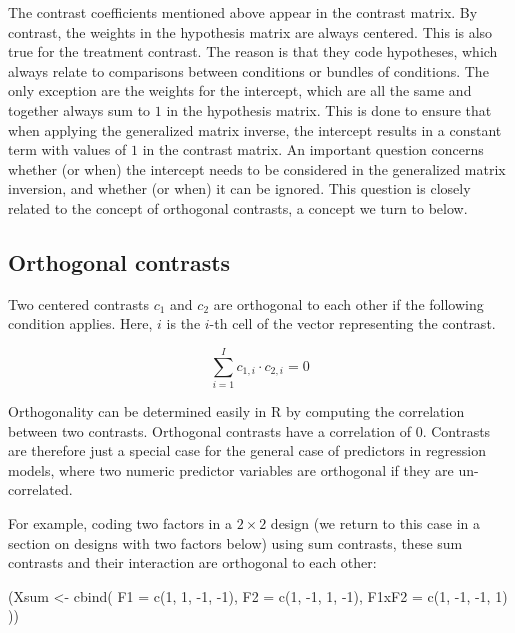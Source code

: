\documentclass[
  12pt,
]{krantz}
\newenvironment{Shaded}{\begin{snugshade}}{\end{snugshade}}
\newcommand{\AttributeTok}[1]{\textcolor[rgb]{0.77,0.63,0.00}{#1}}
\newcommand{\DecValTok}[1]{\textcolor[rgb]{0.00,0.00,0.81}{#1}}
\newcommand{\FunctionTok}[1]{\textcolor[rgb]{0.00,0.00,0.00}{#1}}
\newcommand{\NormalTok}[1]{#1}
\newcommand{\OtherTok}[1]{\textcolor[rgb]{0.56,0.35,0.01}{#1}}
\newcommand{\SpecialCharTok}[1]{\textcolor[rgb]{0.00,0.00,0.00}{#1}}
\theoremstyle{definition}
\theoremstyle{definition}
\theoremstyle{definition}
\theoremstyle{definition}
\theoremstyle{remark}
\begin{document}
The contrast coefficients mentioned above appear in the contrast matrix. By contrast, the weights in the hypothesis matrix are always centered. This is also true for the treatment contrast. The reason is that they code hypotheses, which always relate to comparisons between conditions or bundles of conditions.
The only exception are the weights for the intercept, which are all the same and together always sum to \(1\) in the hypothesis matrix. This is done to ensure that when applying the generalized matrix inverse, the intercept results in a constant term with values of \(1\) in the contrast matrix.
An important question concerns whether (or when) the intercept needs to be considered in the generalized matrix inversion, and whether (or when) it can be ignored. This question is closely related to the concept of orthogonal contrasts, a concept we turn to below.

\hypertarget{orthogonal-contrasts}{%
\subsection{Orthogonal contrasts}\label{orthogonal-contrasts}}

Two centered contrasts \(c_1\) and \(c_2\) are orthogonal to each other if the following condition applies. Here, \(i\) is the \(i\)-th cell of the vector representing the contrast.

\begin{equation}
\sum_{i=1}^I c_{1,i} \cdot c_{2,i} = 0
\end{equation}

Orthogonality can be determined easily in R by computing the correlation between two contrasts. Orthogonal contrasts have a correlation of \(0\). Contrasts are therefore just a special case for the general case of predictors in regression models, where two numeric predictor variables are orthogonal if they are un-correlated.

For example, coding two factors in a \(2 \times 2\) design (we return to this case in a section on designs with two factors below) using sum contrasts, these sum contrasts and their interaction are orthogonal to each other:

\begin{Shaded}
\begin{Highlighting}[]
\NormalTok{(Xsum }\OtherTok{\textless{}{-}} \FunctionTok{cbind}\NormalTok{(}
  \AttributeTok{F1 =} \FunctionTok{c}\NormalTok{(}\DecValTok{1}\NormalTok{, }\DecValTok{1}\NormalTok{, }\SpecialCharTok{{-}}\DecValTok{1}\NormalTok{, }\SpecialCharTok{{-}}\DecValTok{1}\NormalTok{), }\AttributeTok{F2 =} \FunctionTok{c}\NormalTok{(}\DecValTok{1}\NormalTok{, }\SpecialCharTok{{-}}\DecValTok{1}\NormalTok{, }\DecValTok{1}\NormalTok{, }\SpecialCharTok{{-}}\DecValTok{1}\NormalTok{),}
  \AttributeTok{F1xF2 =} \FunctionTok{c}\NormalTok{(}\DecValTok{1}\NormalTok{, }\SpecialCharTok{{-}}\DecValTok{1}\NormalTok{, }\SpecialCharTok{{-}}\DecValTok{1}\NormalTok{, }\DecValTok{1}\NormalTok{)}
\NormalTok{))}
\end{Highlighting}
\end{Shaded}
\end{document}
